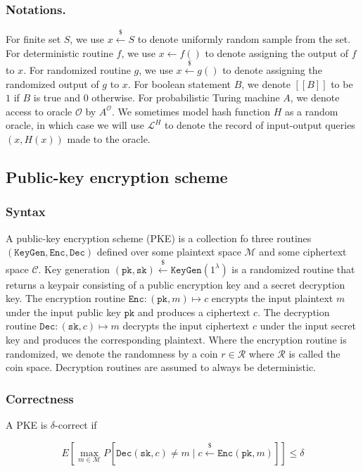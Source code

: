 \documentclass[runningheads]{llncs}
\newcommand{\keygen}{\texttt{KeyGen}}
\newcommand{\encrypt}{\texttt{Enc}}
\newcommand{\decrypt}{\texttt{Dec}}
\newcommand{\pk}{\texttt{pk}}
\newcommand{\sk}{\texttt{sk}}
\newcommand{\leftsample}{\stackrel{\$}{\leftarrow}}
\newcommand{\llbrack}{[\![}
\newcommand{\rrbrack}{]\!]}
\begin{document}
\subsubsection{Notations.} For finite set $S$, we use $x \leftsample S$ to denote uniformly random sample from the set. For deterministic routine $f$, we use $x \leftarrow f()$ to denote assigning the output of $f$ to $x$. For randomized routine $g$, we use $x \leftsample g()$ to denote assigning the randomized output of $g$ to $x$. For boolean statement $B$, we denote $\llbrack B \rrbrack$ to be $1$ if $B$ is true and $0$ otherwise. For probabilistic Turing machine $A$, we denote access to oracle $\mathcal{O}$ by $A^\mathcal{O}$. We sometimes model hash function $H$ as a random oracle, in which case we will use $\mathcal{L}^H$ to denote the record of input-output queries $(x, H(x))$ made to the oracle.

\subsection{Public-key encryption scheme}
\subsubsection{Syntax} A public-key encryption scheme (PKE) is a collection fo three routines $(\keygen, \encrypt, \decrypt)$ defined over some plaintext space $\mathcal{M}$ and some ciphertext space $\mathcal{C}$. Key generation $(\pk, \sk) \leftsample \keygen(1^\lambda)$ is a randomized routine that returns a keypair consisting of a public encryption key and a secret decryption key. The encryption routine $\encrypt: (\pk, m) \mapsto c$ encrypts the input plaintext $m$ under the input public key $\pk$ and produces a ciphertext $c$. The decryption routine $\decrypt: (\sk, c) \mapsto m$ decrypts the input ciphertext $c$ under the input secret key and produces the corresponding plaintext. Where the encryption routine is randomized, we denote the randomness by a coin $r \in \mathcal{R}$ where $\mathcal{R}$ is called the coin space. Decryption routines are assumed to always be deterministic.

\subsubsection{Correctness} A PKE is $\delta$-correct if

\begin{equation*}
    E\left[\max_{m\in\mathcal{M}}
        P\left[ \decrypt(\sk, c) \neq m \mid c \leftsample \encrypt(\pk, m)\right]
    \right] \leq \delta
\end{equation*}
\end{document}
